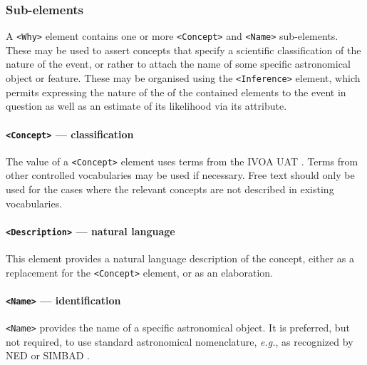 \documentclass[11pt,a4paper]{ivoa}
\begin{document}
\subsubsection{Sub-elements}
A \verb|<Why>| element contains one or more \verb|<Concept>| and \verb|<Name>|
sub-elements. These may be used to assert concepts that specify a scientific
classification of the nature of the event, or rather to attach the name of some
specific astronomical object or feature. These may be organised using the
\verb|<Inference>| element, which permits expressing the nature of the
of the contained elements to the event in question as well as an estimate of its
likelihood via its  attribute.

\paragraph{\texttt{<Concept>} --- classification}\label{sec:3.6.3}
The value of a \verb|<Concept>| element uses terms from
the IVOA UAT \citep{2022ivoa.spec.0722D}. Terms from other controlled vocabularies
may be used if necessary. Free text should only be used for the cases where the
relevant concepts are not described in existing vocabularies.

\paragraph{\texttt{<Description>} --- natural language}\label{sec:3.6.4}
This element provides a natural language description of the concept, either as
a replacement for the \verb|<Concept>| element, or as an elaboration.

\paragraph{\texttt{<Name>} --- identification}\label{sec:3.6.5}
\verb|<Name>| provides the name of a specific astronomical object. It is
preferred, but not required, to use standard astronomical nomenclature,
\emph{e.g.}, as recognized by NED \citep{bib22} or SIMBAD \citep{bib23}.
\end{document}
